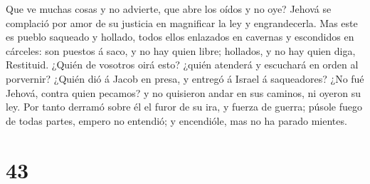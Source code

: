  Que ve muchas cosas y no advierte, que abre los oídos y
no oye?  Jehová se complació por amor de su justicia en
magnificar la ley y engrandecerla.  Mas este es pueblo
saqueado y hollado, todos ellos enlazados en cavernas y escondidos en
cárceles: son puestos á saco, y no hay quien libre; hollados, y no hay
quien diga, Restituid.  ¿Quién de vosotros oirá esto?
¿quién atenderá y escuchará en orden al porvernir? 
¿Quién dió á Jacob en presa, y entregó á Israel á saqueadores? ¿No fué
Jehová, contra quien pecamos? y no quisieron andar en sus caminos, ni
oyeron su ley.  Por tanto derramó sobre él el furor de su
ira, y fuerza de guerra; púsole fuego de todas partes, empero no
entendió; y encendióle, mas no ha parado mientes.

\hypertarget{section-42}{%
\section{43}\label{section-42}}

